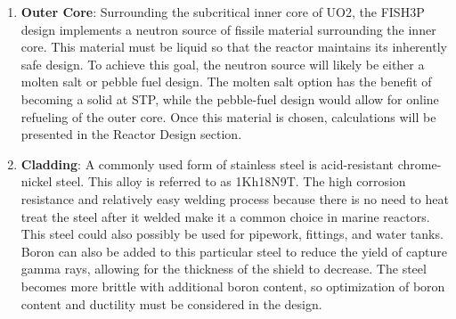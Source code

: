 \documentclass[12pt]{article}
\begin{document}
\begin{enumerate}
\item \textbf{Outer Core}: \newline
Surrounding the subcritical inner core of UO2, the FISH3P design implements a neutron source of fissile material surrounding the inner core.  This material must be liquid so that the reactor maintains its inherently safe design.  To achieve this goal, the neutron source will likely be either a molten salt or pebble fuel design.  The molten salt option has the benefit of becoming a solid at STP, while the pebble-fuel design would allow for online refueling of the outer core.  Once this material is chosen, calculations will be presented in the Reactor Design section.
\item \textbf{Cladding}: \newline
A commonly used form of stainless steel is acid-resistant chrome-nickel steel.  This alloy is referred to as 1Kh18N9T.  The high corrosion resistance and relatively easy welding process because there is no need to heat treat the steel after it welded make it a common choice in marine reactors.  This steel could also possibly be used for pipework, fittings, and water tanks.  Boron can also be added to this particular steel to reduce the yield of capture gamma rays, allowing for the thickness of the shield to decrease.  The steel becomes more brittle with additional boron content, so optimization of boron content and ductility must be considered in the design.

\end{enumerate}
\end{document}
